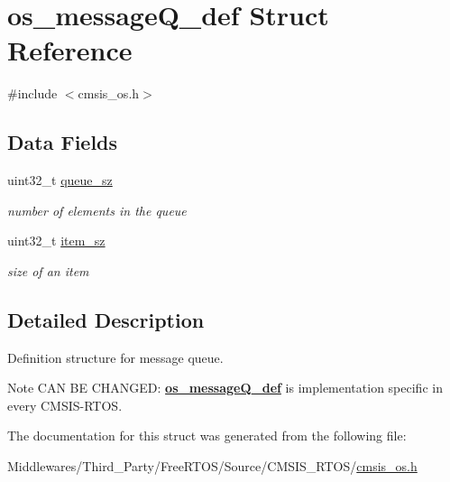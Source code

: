 \hypertarget{structos__message_q__def}{}\section{os\+\_\+message\+Q\+\_\+def Struct Reference}
\label{structos__message_q__def}


{\ttfamily \#include $<$cmsis\+\_\+os.\+h$>$}

\subsection*{Data Fields}
\begin{DoxyCompactItemize}
\item 
\mbox{\label{structos__message_q__def_a8a83a3a8c0aa8057b13807d2a54077e0}} 
uint32\+\_\+t \mbox{\hyperlink{structos__message_q__def_a8a83a3a8c0aa8057b13807d2a54077e0}{queue\+\_\+sz}}
\begin{DoxyCompactList}\small\item\em number of elements in the queue \end{DoxyCompactList}\item 
\mbox{\label{structos__message_q__def_a4c2a0c691de3365c00ecd22d8102811f}} 
uint32\+\_\+t \mbox{\hyperlink{structos__message_q__def_a4c2a0c691de3365c00ecd22d8102811f}{item\+\_\+sz}}
\begin{DoxyCompactList}\small\item\em size of an item \end{DoxyCompactList}\end{DoxyCompactItemize}


\subsection{Detailed Description}
Definition structure for message queue. \begin{DoxyNote}{Note}
C\+AN BE C\+H\+A\+N\+G\+ED\+: {\bfseries \mbox{\hyperlink{structos__message_q__def}{os\+\_\+message\+Q\+\_\+def}}} is implementation specific in every C\+M\+S\+I\+S-\/\+R\+T\+OS. 
\end{DoxyNote}


The documentation for this struct was generated from the following file\+:\begin{DoxyCompactItemize}
\item 
Middlewares/\+Third\+\_\+\+Party/\+Free\+R\+T\+O\+S/\+Source/\+C\+M\+S\+I\+S\+\_\+\+R\+T\+O\+S/\mbox{\hyperlink{cmsis__os_8h}{cmsis\+\_\+os.\+h}}\end{DoxyCompactItemize}
